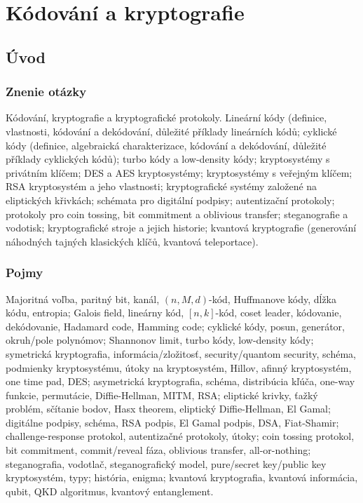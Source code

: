 \section{Kódování a kryptografie}

\subsection{Úvod}

\subsubsection{Znenie otázky}

Kódování, kryptografie a kryptografické protokoly. Lineární 
kódy (definice, vlastnosti, kódování a dekódování, důležité příklady 
lineárních kódů; cyklické kódy (definice, algebraická charakterizace, 
kódování a dekódování, důležité příklady cyklických kódů); turbo 
kódy a low-density kódy; kryptosystémy s privátním klíčem; DES a AES 
kryptosystémy; kryptosystémy s veřejným klíčem; RSA kryptosystém a jeho 
vlastnosti; kryptografické systémy založené na eliptických křivkách; 
schémata pro digitální podpisy; autentizační protokoly; protokoly pro 
coin tossing, bit commitment a oblivious transfer; steganografie a vodotisk; 
kryptografické stroje a jejich historie; kvantová kryptografie (generování 
náhodných tajných klasických klíčů, kvantová teleportace).

\subsubsection{Pojmy}
Majoritná voľba, paritný bit, kanál, $(n,M,d)$-kód, Huffmanove kódy,
dĺžka kódu, entropia; Galois field, lineárny kód, $[n,k]$-kód, coset
leader, kódovanie, dekódovanie, Hadamard code, Hamming code; cyklické 
kódy, posun, generátor, okruh/pole polynómov; Shannonov limit, turbo kódy,
low-density kódy; symetrická kryptografia, informácia/zložitosť, 
security/quantom security, schéma, podmienky kryptosystému, útoky na
kryptosystém, Hillov, afinný kryptosystém, one time pad, DES;
asymetrická kryptografia, schéma, distribúcia kľúča, one-way funkcie,
permutácie, Diffie-Hellman, MITM, RSA; eliptické krivky, ťažký problém,
sčítanie bodov, Hasx theorem, eliptický Diffie-Hellman, El Gamal;
digitálne podpisy, schéma, RSA podpis, El Gamal podpis, DSA, Fiat-Shamir;
challenge-response protokol, autentizačné protokoly, útoky;
coin tossing protokol, bit commitment, commit/reveal fáza, oblivious
transfer, all-or-nothing; steganografia, vodotlač, steganografický model,
pure/secret key/public key kryptosystém, typy; história, enigma;
kvantová kryptografia, kvantová informácia, qubit, QKD algoritmus, kvantový
entanglement.

